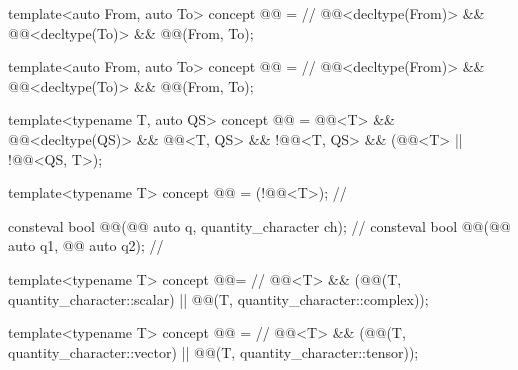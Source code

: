 \begin{itemdecl}
template<auto From, auto To>
concept @@ =                // \expos
  @@<decltype(From)> && @@<decltype(To)> && @@(From, To);

template<auto From, auto To>
concept @@ =                             // \expos
  @@<decltype(From)> && @@<decltype(To)> && @@(From, To);

template<typename T, auto QS>
concept @@ =
  @@<T> && @@<decltype(QS)> && @@<T{}, QS> &&
  !@@<T{}, QS> &&
  (@@<T> || !@@<QS, T{}>);

template<typename T>
concept @@ = (!@@<T>);                     // \expos

consteval bool @@(@@ auto q, quantity_character ch);      // \expos
consteval bool @@(@@ auto q1, @@ auto q2);  // \expos

template<typename T>
concept @@=                                      // \expos
  @@<T> && (@@(T{}, quantity_character::scalar) ||
                        @@(T{}, quantity_character::complex));

template<typename T>
concept @@ =                                   // \expos
  @@<T> && (@@(T{}, quantity_character::vector) ||
                        @@(T{}, quantity_character::tensor));
\end{itemdecl}

